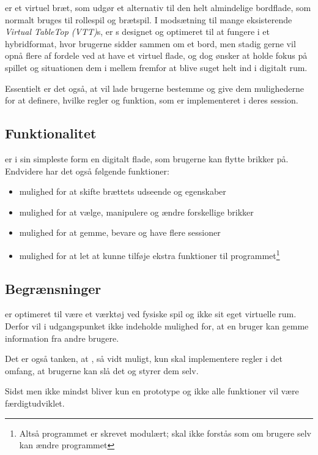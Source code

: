 \projectName{} er et virtuel bræt, som udgør et alternativ til den helt almindelige bordflade, som normalt bruges til rollespil og brætspil. I modsætning til mange eksisterende \textit{Virtual TableTop (VTT)}s, er \projectName{}s designet og optimeret til at fungere i et hybridformat, hvor brugerne sidder sammen om et bord, men stadig gerne vil opnå flere af fordele ved at have et virtuel flade, og dog ønsker at holde fokus på spillet og situationen dem i mellem fremfor at blive suget helt ind i digitalt rum.\par{}
Essentielt er det også, at \projectName{} vil lade brugerne bestemme og give dem mulighederne for at definere, hvilke regler og funktion, som er implementeret i deres session.\par{}

\subsection{Funktionalitet}

\projectName{} er i sin simpleste form en digitalt flade, som brugerne kan flytte brikker på.
Endvidere har det også følgende funktioner:
\begin{itemize}
\item mulighed for at skifte brættets udseende og egenskaber
\item mulighed for at vælge, manipulere og ændre forskellige brikker
\item mulighed for at gemme, bevare og have flere sessioner
\item mulighed for at let at kunne tilføje ekstra funktioner til programmet\footnote{Altså programmet er skrevet modulært; skal ikke forstås som om brugere selv kan ændre programmet}
\end{itemize}

\subsection{Begrænsninger}

\projectName{} er optimeret til være et værktøj ved fysiske spil og ikke sit eget virtuelle rum. Derfor vil i udgangspunket ikke indeholde mulighed for, at en bruger kan gemme information fra andre brugere.\par{}
Det er også tanken, at \projectName{}, så vidt muligt, kun skal implementere regler i det omfang, at brugerne kan slå det og styrer dem selv.\par{}
Sidst men ikke mindst bliver \projectName{} kun en prototype og ikke alle funktioner vil være færdigtudviklet.


